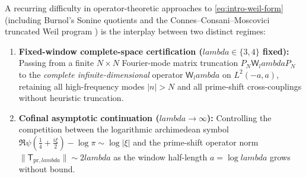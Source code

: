 \documentclass[11pt]{article}
\def\lambda{lambda}%
\theoremstyle{remark}
\begin{document}
A recurring difficulty in operator-theoretic approaches to \eqref{eq:intro-weil-form} (including Burnol's Sonine quotients \cite{BurnolExplicit2000,Burnol2002Sonine} and the Connes--Consani--Moscovici truncated Weil program \cite{ConnesConsaniMoscovici2025,ConnesVanSuijlekom2025}) is the interplay between two distinct regimes:
\begin{enumerate}[label=(\roman*)]
\item \textbf{Fixed-window complete-space certification ($\lambda\in\{3,4\}$ fixed):} Passing from a finite $N\times N$ Fourier-mode matrix truncation $P_N\mathsf W_\lambda P_N$ to the \emph{complete infinite-dimensional} operator $\mathsf W_\lambda$ on $L^2(-a,a)$, retaining all high-frequency modes $|n|>N$ and all prime-shift cross-couplings without heuristic truncation.
\item \textbf{Cofinal asymptotic continuation ($\lambda\to\infty$):} Controlling the competition between the logarithmic archimedean symbol $\Re\psi(\tfrac14+\tfrac{i\xi}{2})-\log\pi \sim \log|\xi|$ and the prime-shift operator norm $\|\mathsf T_{\mathrm{pr},\lambda}\|\sim 2\lambda$ as the window half-length $a=\log\lambda$ grows without bound.
\end{enumerate}
\end{document}
